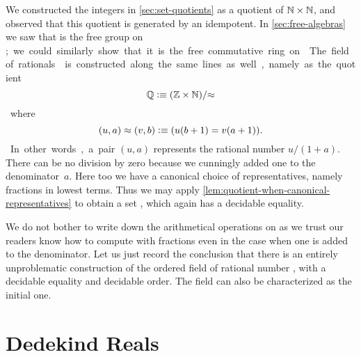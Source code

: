 We constructed the integers \Z in \autoref{sec:set-quotients} as a quotient of $\mathbb{N}\times
\mathbb{N}$, and observed that this quotient is generated by an idempotent. In
\autoref{sec:free-algebras} we saw that \Z is the free group on \unit; we could similarly
show that it is the free commutative ring on \emptyt. The field of rationals \Q is
constructed along the same lines as well, namely as the quotient
%
\[ \mathbb{Q} \vcentcolon\equiv (\mathbb{Z} \times \mathbb{N})/{\approx} \]
%
where
\[ (u,a) \approx (v,b) \vcentcolon\equiv (u (b + 1) = v (a + 1)). \]
%
In other words, a pair $(u, a)$ represents the rational number $u / (1 + a)$. There can be
no division by zero because we cunningly added one to the denominator~$a$. Here too we
have a canonical choice of representatives, namely fractions in lowest terms. Thus we may
apply \autoref{lem:quotient-when-canonical-representatives} to obtain a set \Q, which
again has a decidable equality.

We do not bother to write down the arithmetical operations on \Q as we trust our readers
know how to compute with fractions even in the case when one is added to the denominator.
Let us just record the conclusion that there is an entirely unproblematic construction of
the ordered field of rational number \Q, with a decidable equality and decidable order.
The field \Q can also be characterized as the initial one.

\section{Dedekind Reals}
\label{sec:dedekind-reals}


